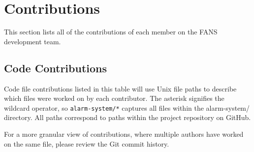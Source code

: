 \section{Contributions}

This section lists all of the contributions of each member on the FANS development team.

\subsection{Code Contributions}

Code file contributions listed in this table will use Unix file paths to describe which files were worked on by each
contributor. The asterisk signifies the wildcard operator, so \texttt{alarm-system/*} captures all files within the
alarm-system/ directory. All paths correspond to paths within the project repository on GitHub.

For a more granular view of contributions, where multiple authors have worked on the same file, please review the Git
commit history.

